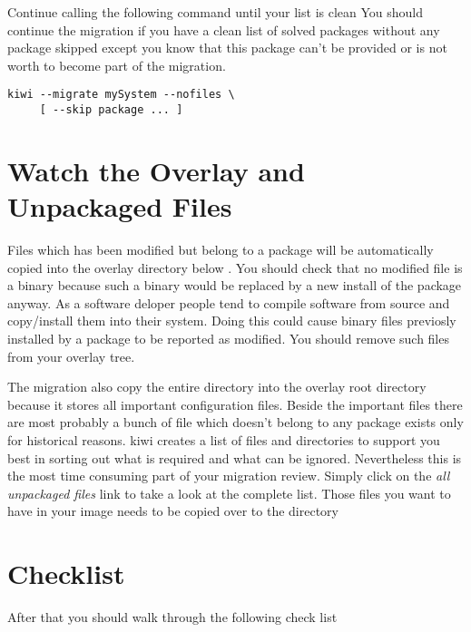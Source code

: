 Continue calling the following command until your list is clean
You should continue the migration if you have a clean list of solved
packages without any package skipped except you know that this package
can't be provided or is not worth to become part of the migration.

\begin{Command}{14cm}
\begin{verbatim}
kiwi --migrate mySystem --nofiles \
     [ --skip package ... ]
\end{verbatim}
\end{Command}

\section{Watch the Overlay and Unpackaged Files}
Files which has been modified but belong to a package will be
automatically copied into the overlay directory below
. You should check that no modified file
is a binary because such a binary would be replaced by a new
install of the package anyway. As a software deloper people
tend to compile software from source and copy/install them
into their system. Doing this could cause binary files previosly
installed by a package to be reported as modified. You should
remove such files from your overlay tree.

The migration also copy the entire  directory into the
overlay root directory because it stores all important configuration
files. Beside the important files there are most probably a bunch
of file which doesn't belong to any package exists only for
historical reasons. kiwi creates a list of files and
directories to support you best in sorting out what is required
and what can be ignored. Nevertheless this is the most
time consuming part of your migration review. Simply click on
the \textit{all unpackaged files} link to take a look at the
complete list. Those files you want to have in your image needs
to be copied over to the  directory

\section{Checklist}
After that you should walk through the following check list

